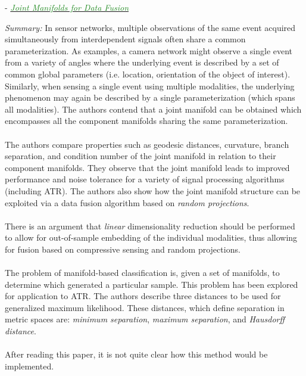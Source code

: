 \documentclass[]{article}
\newcommand{\paperentry}[4]{
            \hangindent=1cm
            \cite{#1} - \href{run:../References/#3}{\textcolor{ForestGreen}{\textit{#2}}}
            
            \noindent            
            \begin{minipage}[t]{0.1\linewidth}\hfill\end{minipage}
            \begin{minipage}[t]{0.8\linewidth}\textcolor{NavyBlue}{{\textit{Summary:}}}#4\end{minipage}
            \vspace{.25cm}
          }
\begin{document}
		
		\paperentry{Davenport2010JointManifoldsDataFusion}
		{Joint Manifolds for Data Fusion}
		{Manifold_Representation_Learning/Alignment/Davenport2010JointManifoldsDataFusion.pdf}
		{ In sensor networks, multiple observations of the same event acquired simultaneously from interdependent signals often share a common parameterization.  As examples, a camera network might observe a single event from a variety of angles where the underlying event is described by a set of common global parameters (i.e. location, orientation of the object of interest).  Similarly, when sensing a single event using multiple modalities, the underlying phenomenon may again be described by a single parameterization (which spans all modalities).  The authors contend that a joint manifold can be obtained which encompasses all the component manifolds sharing the same parameterization.
		\\ \\
		The authors compare properties such as geodesic distances, curvature, branch separation, and condition number of the joint manifold in relation to their component manifolds.  They observe that the joint manifold leads to improved performance and noise tolerance for a variety of signal processing algorithms (including ATR). The authors also show how the joint manifold structure can be exploited via a data fusion algorithm based on \textit{random projections}.
		\\ \\
		There is an argument that \textit{linear} dimensionality reduction should be performed to allow for out-of-sample embedding of the individual modalities, thus allowing for fusion based on compressive sensing and random projections.
		\\ \\
		The problem of manifold-based classification is, given a set of manifolds, to determine which generated a particular sample.  This problem has been explored for application to ATR. The authors describe three distances to be used for generalized maximum likelihood.  These distances, which define separation in metric spaces are: \textit{minimum separation}, \textit{maximum separation}, and \textit{Hausdorff distance}.
		\\ \\
		After reading this paper, it is not quite clear how this method would be implemented. 
		} \\
		
\end{document}
